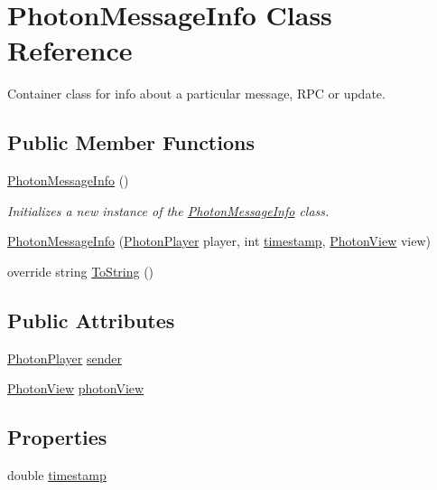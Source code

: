 \hypertarget{class_photon_message_info}{}\section{Photon\+Message\+Info Class Reference}
\label{class_photon_message_info}


Container class for info about a particular message, R\+PC or update.  


\subsection*{Public Member Functions}
\begin{DoxyCompactItemize}
\item 
\hyperlink{class_photon_message_info_adcd7a00ff6df6f431fb9de2db28f92b9}{Photon\+Message\+Info} ()
\begin{DoxyCompactList}\small\item\em Initializes a new instance of the \hyperlink{class_photon_message_info}{Photon\+Message\+Info} class. \end{DoxyCompactList}\item 
\hyperlink{class_photon_message_info_a8497209fff12bb41b79d010905e1cb39}{Photon\+Message\+Info} (\hyperlink{class_photon_player}{Photon\+Player} player, int \hyperlink{class_photon_message_info_a8a9879f9d95f99f4d066aba32d5853ca}{timestamp}, \hyperlink{class_photon_view}{Photon\+View} view)
\item 
override string \hyperlink{class_photon_message_info_adf3bb70090d012d863d915f564e7018f}{To\+String} ()
\end{DoxyCompactItemize}
\subsection*{Public Attributes}
\begin{DoxyCompactItemize}
\item 
\hyperlink{class_photon_player}{Photon\+Player} \hyperlink{class_photon_message_info_a08a4759b1a689d268bb1ea3cc99c5223}{sender}
\item 
\hyperlink{class_photon_view}{Photon\+View} \hyperlink{class_photon_message_info_a1244048dcad8a8c2332591dca458bfea}{photon\+View}
\end{DoxyCompactItemize}
\subsection*{Properties}
\begin{DoxyCompactItemize}
\item 
double \hyperlink{class_photon_message_info_a8a9879f9d95f99f4d066aba32d5853ca}{timestamp}
\end{DoxyCompactItemize}


